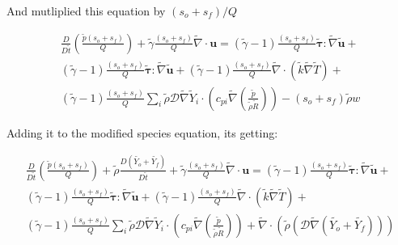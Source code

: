 \documentclass[preprint,12pt,authoryear]{elsarticle}
\begin{document}
And mutliplied this equation by  $(s_o+s_f)/Q$

\begin{equation}
\begin{split}
	\frac{D }{D\tilde{t}}
	\left(
		\frac{\tilde{p}(s_o+s_f)}{Q}
	\right)
	+
	\tilde{\gamma}
	\frac{(s_o+s_f)}{Q}
	\tilde{\nabla}\cdot{\mathbf{u}}
        =
	(\tilde{\gamma}-1)
	\frac{(s_o+s_f)}{Q}
        \pmb{\tilde{\tau}}:\tilde{\nabla} \tilde{\mathbf{u}} 
        + 
	\\
	(\tilde{\gamma}-1)
	\frac{(s_o+s_f)}{Q}
        \pmb{\tilde{\tau}}:\tilde{\nabla} \tilde{\mathbf{u}} 
        + 
	(\tilde{\gamma}-1)
	\frac{(s_o+s_f)}{Q}
        \tilde{\nabla} \cdot (\tilde{k}\tilde{\nabla} \tilde{T})
        +
	\\
	(\tilde{\gamma}-1)
	\frac{(s_o+s_f)}{Q}
        \sum\limits_i 
        \tilde{\rho}
        \mathcal{D}
        \tilde{\nabla}
        \tilde{Y}_i     
        \cdot
        \left(
                c_{pi}
                \tilde{\nabla}
                \left(
                	\frac{\tilde{p}}{\tilde{\rho}\tilde{R}}
                \right)
        \right)
	- 
	(s_o+s_f)
	\tilde{\rho}w
\end{split}
\end{equation}

Adding it to the modified species equation, its getting:

\begin{equation}
\begin{split}
	\frac{D }{D\tilde{t}}
	\left(
		\frac{\tilde{p}(s_o+s_f)}{Q}
	\right)
	+
	\tilde{\rho} \frac{D  (\tilde{Y_o}+\tilde{Y_f})}{D \tilde{t}}
	+
	\tilde{\gamma}
	\frac{(s_o+s_f)}{Q}
	\tilde{\nabla}\cdot{\mathbf{u}}
        =
	(\tilde{\gamma}-1)
	\frac{(s_o+s_f)}{Q}
        \pmb{\tilde{\tau}}:\tilde{\nabla} \tilde{\mathbf{u}} 
        + 
	\\
	(\tilde{\gamma}-1)
	\frac{(s_o+s_f)}{Q}
        \pmb{\tilde{\tau}}:\tilde{\nabla} \tilde{\mathbf{u}} 
        + 
	(\tilde{\gamma}-1)
	\frac{(s_o+s_f)}{Q}
        \tilde{\nabla} \cdot (\tilde{k}\tilde{\nabla} \tilde{T})
        +
	\\
	(\tilde{\gamma}-1)
	\frac{(s_o+s_f)}{Q}
        \sum\limits_i 
        \tilde{\rho}
        \mathcal{D}
        \tilde{\nabla}
        \tilde{Y}_i     
        \cdot
        \left(
                c_{pi}
                \tilde{\nabla}
                \left(
                	\frac{\tilde{p}}{\tilde{\rho}\tilde{R}}
                \right)
        \right)
	+
	\tilde{\nabla}
	\cdot
	\left( 
		\tilde{\rho} 
		\left( 
			\mathcal{D}\tilde{\nabla} (\tilde{Y_o}+\tilde{Y_f})
		\right) 
	\right) 
\end{split}
\end{equation}
\end{document}
